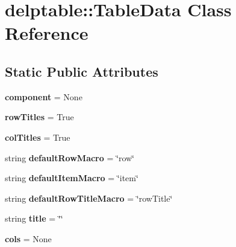 \hypertarget{classdelptable_1_1TableData}{
\section{delptable::TableData Class Reference}
\label{classdelptable_1_1TableData}
}
\subsection*{Static Public Attributes}
\begin{DoxyCompactItemize}
\item 
\hypertarget{classdelptable_1_1TableData_aa4b9ec78f0b13b68dc513b359da85cab}{
{\bfseries component} = None}
\label{classdelptable_1_1TableData_aa4b9ec78f0b13b68dc513b359da85cab}

\item 
\hypertarget{classdelptable_1_1TableData_a6f820715f7b62c2b7a253b0599193fd3}{
{\bfseries rowTitles} = True}
\label{classdelptable_1_1TableData_a6f820715f7b62c2b7a253b0599193fd3}

\item 
\hypertarget{classdelptable_1_1TableData_ac0cede5383cd4494f98b181439c4cea2}{
{\bfseries colTitles} = True}
\label{classdelptable_1_1TableData_ac0cede5383cd4494f98b181439c4cea2}

\item 
\hypertarget{classdelptable_1_1TableData_a604b253d86530650ded0303fdfc936a7}{
string {\bfseries defaultRowMacro} = \char`\"{}row\char`\"{}}
\label{classdelptable_1_1TableData_a604b253d86530650ded0303fdfc936a7}

\item 
\hypertarget{classdelptable_1_1TableData_ab960c47af952e09eb37c1ff7e0763c50}{
string {\bfseries defaultItemMacro} = \char`\"{}item\char`\"{}}
\label{classdelptable_1_1TableData_ab960c47af952e09eb37c1ff7e0763c50}

\item 
\hypertarget{classdelptable_1_1TableData_a82c29a3214048488e9ba252520577476}{
string {\bfseries defaultRowTitleMacro} = \char`\"{}rowTitle\char`\"{}}
\label{classdelptable_1_1TableData_a82c29a3214048488e9ba252520577476}

\item 
\hypertarget{classdelptable_1_1TableData_a543b3d504ce330ef93e2272e0bcbcfc4}{
string {\bfseries title} = \char`\"{}\char`\"{}}
\label{classdelptable_1_1TableData_a543b3d504ce330ef93e2272e0bcbcfc4}

\item 
\hypertarget{classdelptable_1_1TableData_ada363371a19a23fe2ead7cb396fffcab}{
{\bfseries cols} = None}
\label{classdelptable_1_1TableData_ada363371a19a23fe2ead7cb396fffcab}


\end{DoxyCompactItemize}
